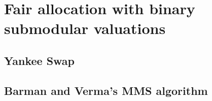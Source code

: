 \chapter{Fair allocation with binary submodular valuations}
\skelpars[2]

\section{Yankee Swap}
\skelpars[12]

\section{Barman and Verma's MMS algorithm}
\skelpars[9]